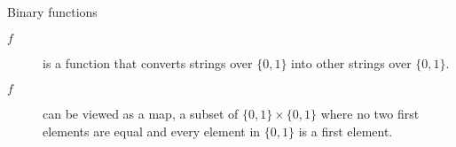 \begin{frame}{Binary functions}

  \begin{description}
    \item[$f$] is a function that converts strings over $\{0,1\}$ into other strings over $\{0,1\}$.
    \item[$f$] can be viewed as a map, a subset of $\{0,1\} \times \{0,1\}$ where no two first elements are equal and every element in $\{0,1\}$ is a first element.
  \end{description}
\end{frame}